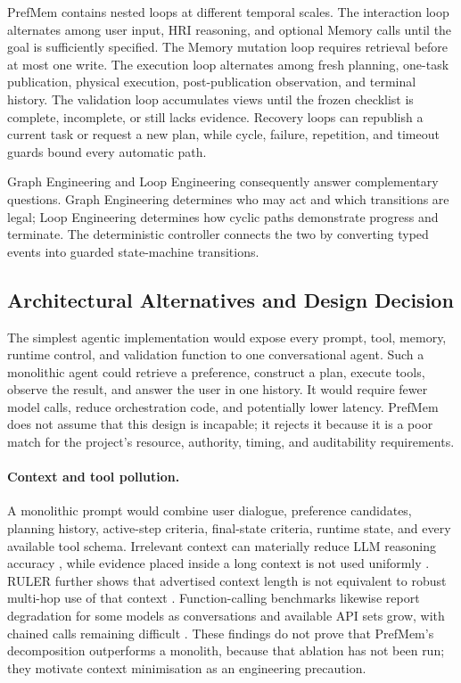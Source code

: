 \documentclass{article}
\begin{document}
PrefMem contains nested loops at different temporal scales. The interaction
loop alternates among user input, HRI reasoning, and optional Memory calls until
the goal is sufficiently specified. The Memory mutation loop requires
retrieval before at most one write. The execution loop alternates among fresh
planning, one-task publication, physical execution, post-publication
observation, and terminal history. The validation loop accumulates views until
the frozen checklist is complete, incomplete, or still lacks evidence.
Recovery loops can republish a current task or request a new plan, while cycle,
failure, repetition, and timeout guards bound every automatic path.

Graph Engineering and Loop Engineering consequently answer complementary
questions. Graph Engineering determines who may act and which transitions are
legal; Loop Engineering determines how cyclic paths demonstrate progress and
terminate. The deterministic controller connects the two by converting typed
events into guarded state-machine transitions.

\subsection{Architectural Alternatives and Design Decision}
\label{subsec:methodology-alternatives}

The simplest agentic implementation would expose every prompt, tool, memory,
runtime control, and validation function to one conversational agent. Such a
monolithic agent could retrieve a preference, construct a plan, execute tools,
observe the result, and answer the user in one history. It would require fewer
model calls, reduce orchestration code, and potentially lower latency. PrefMem
does not assume that this design is incapable; it rejects it because it is a
poor match for the project's resource, authority, timing, and auditability
requirements.

\paragraph{Context and tool pollution.}
A monolithic prompt would combine user dialogue, preference candidates,
planning history, active-step criteria, final-state criteria, runtime state,
and every available tool schema. Irrelevant context can materially reduce LLM
reasoning accuracy \parencite{shi2023irrelevantcontext}, while evidence placed
inside a long context is not used uniformly \parencite{liu2023lostmiddle}.
RULER further shows that advertised context length is not equivalent to robust
multi-hop use of that context \parencite{hsieh2024ruler}. Function-calling
benchmarks likewise report degradation for some models as conversations and
available API sets grow, with chained calls remaining difficult
\parencite{alkhouli2025confetti}. These findings do not prove that PrefMem's
decomposition outperforms a monolith, because that ablation has not been run;
they motivate context minimisation as an engineering precaution.
\end{document}
